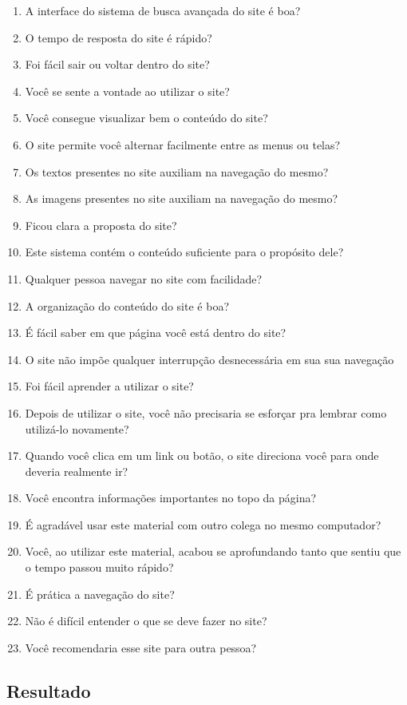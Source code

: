 \begin{enumerate}
	\item A interface do sistema de busca avançada do site é boa?
	\item O tempo de resposta do site é rápido?
	\item Foi fácil sair ou voltar dentro do site?
	\item Você se sente a vontade ao utilizar o site?
	\item Você consegue visualizar bem o conteúdo do site?
	\item O site permite você alternar facilmente entre as menus ou telas?
	\item Os textos presentes no site auxiliam na navegação do mesmo?
	\item As imagens presentes no site auxiliam na navegação do mesmo?
	\item Ficou clara a proposta do site?
	\item Este sistema contém o conteúdo suficiente para o propósito dele? 
	\item Qualquer pessoa navegar no site com facilidade?
	\item A organização do conteúdo do site é boa?
	\item É fácil saber em que página você está dentro do site?
	\item O site não impõe qualquer interrupção desnecessária em sua sua navegação
	\item Foi fácil aprender a utilizar o site?
	\item Depois de utilizar o site, você não precisaria se esforçar pra lembrar como utilizá-lo novamente?
	\item Quando você clica em um link ou botão, o site direciona você para onde deveria realmente ir?
	\item Você encontra informações importantes no topo da página?
	\item É agradável usar este material com outro colega no mesmo computador?
	\item Você, ao utilizar este material, acabou se aprofundando tanto que sentiu que o tempo passou muito rápido?
	\item É prática a navegação do site?
	\item Não é difícil entender o que se deve fazer no site?
	\item Você recomendaria esse site para outra pessoa?
\end{enumerate}


\subsection{Resultado}


